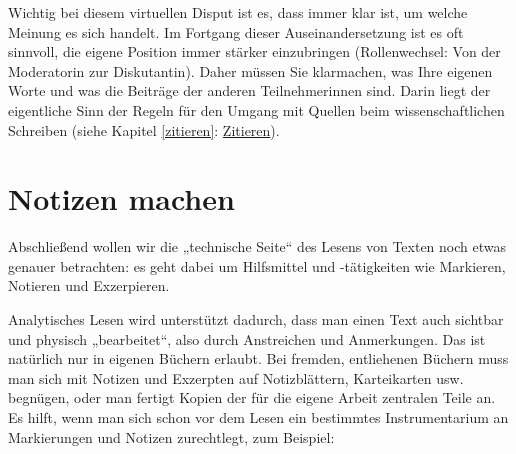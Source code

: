 \documentclass[]{book}
\theoremstyle{definition}
\theoremstyle{definition}
\theoremstyle{definition}
\theoremstyle{remark}
\begin{document}
Wichtig bei diesem virtuellen Disput ist es, dass immer klar ist, um
welche Meinung es sich handelt. Im Fortgang dieser Auseinandersetzung
ist es oft sinnvoll, die eigene Position immer stärker einzubringen
(Rollenwechsel: Von der Moderatorin zur Diskutantin). Daher müssen Sie
klarmachen, was Ihre eigenen Worte und was die Beiträge der anderen
Teilnehmerinnen sind. Darin liegt der eigentliche Sinn der Regeln für
den Umgang mit Quellen beim wissenschaftlichen Schreiben (siehe Kapitel
\ref{zitieren}: \protect\hyperlink{zitieren}{Zitieren}).

\section{Notizen machen}\label{notizen-machen}

Abschließend wollen wir die „technische Seite`` des Lesens von Texten
noch etwas genauer betrachten: es geht dabei um Hilfsmittel und
-tätigkeiten wie Markieren, Notieren und Exzerpieren.

Analytisches Lesen wird unterstützt dadurch, dass man einen Text auch
sichtbar und physisch „bearbeitet``, also durch Anstreichen und
Anmerkungen. Das ist natürlich nur in eigenen Büchern erlaubt. Bei
fremden, entliehenen Büchern muss man sich mit Notizen und Exzerpten auf
Notizblättern, Karteikarten usw. begnügen, oder man fertigt Kopien der
für die eigene Arbeit zentralen Teile an. Es hilft, wenn man sich schon
vor dem Lesen ein bestimmtes Instrumentarium an Markierungen und Notizen
zurechtlegt, zum Beispiel:
\end{document}
